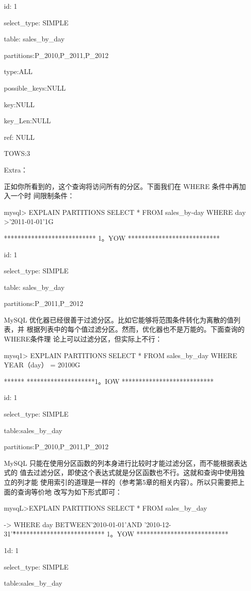 id: 1

select\_type: SIMPLE

table: sales\_by\_day

partitions:P\_2010,P\_2011,P\_2012

type:ALL

possible\_keys:NULL

key:NULL

key\_Len:NULL

ref: NULL

TOWS:3

Extra：

正如你所看到的，这个查询将访问所有的分区。下面我们在 WHERE 条件中再加入一个时
间限制条件：

mysql> EXPLAIN PARTITIONS SELECT * FROM sales\_by-day WHERE day >'2011-01-01'1G

*************************** 1。YOW ***************************

id: 1

select\_type: SIMPLE

table: sales\_by\_day

partitions:P\_2011,P\_2012

MySQL 优化器已经很善于过滤分区。比如它能够将范围条件转化为离散的值列表，并
根据列表中的每个值过滤分区。然而，优化器也不是万能的。下面查询的 WHERE条件理
论上可以过滤分区，但实际上不行：

mysq1> EXPLAIN PARTITIONS SELECT * FROM sales\_by\_day WHERE YEAR（day） = 20100G

****** ********************1。IOW ***************************

id: 1

select\_type: SIMPLE

table:sales\_by\_day

partitions:P\_2010,P\_2011,P\_2012

MySQL 只能在使用分区函数的列本身进行比较时才能过滤分区，而不能根据表达式的
值去过滤分区，即使这个表达式就是分区函数也不行。这就和查询中使用独立的列才能
使用索引的道理是一样的（参考第5章的相关内容）。所以只需要把上面的查询等价地
改写为如下形式即可：

mysqL>EXPLAIN PARTITIONS SELECT * FROM sales\_by\_day

-> WHERE day BETWEEN'2010-01-01'AND '2010-12-31'\G

*************************** 1。YOW ***************************

1d: 1

select\_type: SIMPLE

table:sales\_by\_day

